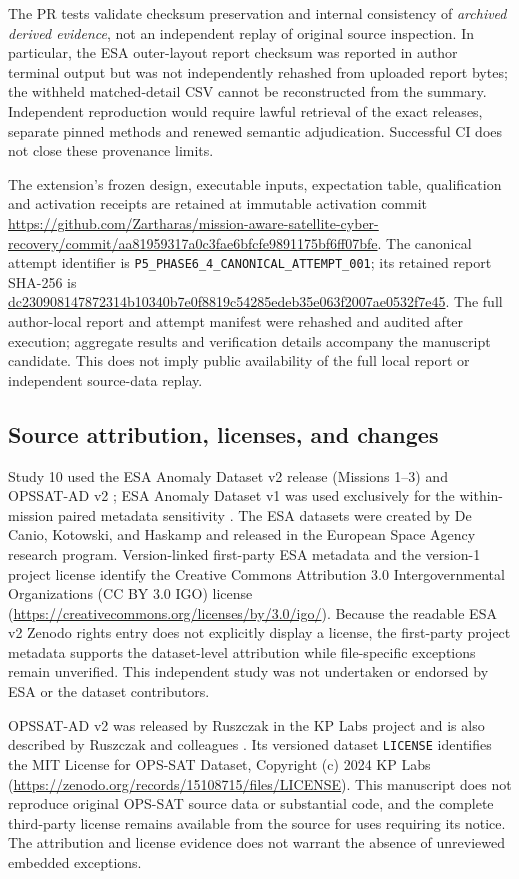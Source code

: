 \documentclass[preprint,12pt]{elsarticle}
\begin{document}
The PR tests validate checksum preservation and internal consistency of \emph{archived derived evidence}, not an independent replay of original source inspection. In particular, the ESA outer-layout report checksum was reported in author terminal output but was not independently rehashed from uploaded report bytes; the withheld matched-detail CSV cannot be reconstructed from the summary. Independent reproduction would require lawful retrieval of the exact releases, separate pinned methods and renewed semantic adjudication. Successful CI does not close these provenance limits.

The extension's frozen design, executable inputs, expectation table, qualification and activation receipts are retained at immutable activation commit \url{https://github.com/Zartharas/mission-aware-satellite-cyber-recovery/commit/aa81959317a0c3fae6bfcfe9891175bf6ff07bfe}. The canonical attempt identifier is \texttt{P5\_PHASE6\_4\_CANONICAL\_ATTEMPT\_001}; its retained report SHA-256 is \url{dc230908147872314b10340b7e0f8819c54285edeb35e063f2007ae0532f7e45}. The full author-local report and attempt manifest were rehashed and audited after execution; aggregate results and verification details accompany the manuscript candidate. This does not imply public availability of the full local report or independent source-data replay.

\subsection{Source attribution, licenses, and changes}
Study 10 used the ESA Anomaly Dataset v2 release (Missions 1--3) \cite{esaad2025v2} and OPSSAT-AD v2 \cite{opssat2024v2}; ESA Anomaly Dataset v1 was used exclusively for the within-mission paired metadata sensitivity \cite{esaad2024v1}. The ESA datasets were created by De Canio, Kotowski, and Haskamp and released in the European Space Agency research program. Version-linked first-party ESA metadata and the version-1 project license identify the Creative Commons Attribution 3.0 Intergovernmental Organizations (CC BY 3.0 IGO) license (\url{https://creativecommons.org/licenses/by/3.0/igo/}). Because the readable ESA v2 Zenodo rights entry does not explicitly display a license, the first-party project metadata supports the dataset-level attribution while file-specific exceptions remain unverified. This independent study was not undertaken or endorsed by ESA or the dataset contributors.

OPSSAT-AD v2 was released by Ruszczak in the KP Labs project and is also described by Ruszczak and colleagues \cite{ruszczak2025opssatbenchmark}. Its versioned dataset \texttt{LICENSE} identifies the MIT License for OPS-SAT Dataset, Copyright (c) 2024 KP Labs (\url{https://zenodo.org/records/15108715/files/LICENSE}). This manuscript does not reproduce original OPS-SAT source data or substantial code, and the complete third-party license remains available from the source for uses requiring its notice. The attribution and license evidence does not warrant the absence of unreviewed embedded exceptions.
\end{document}
